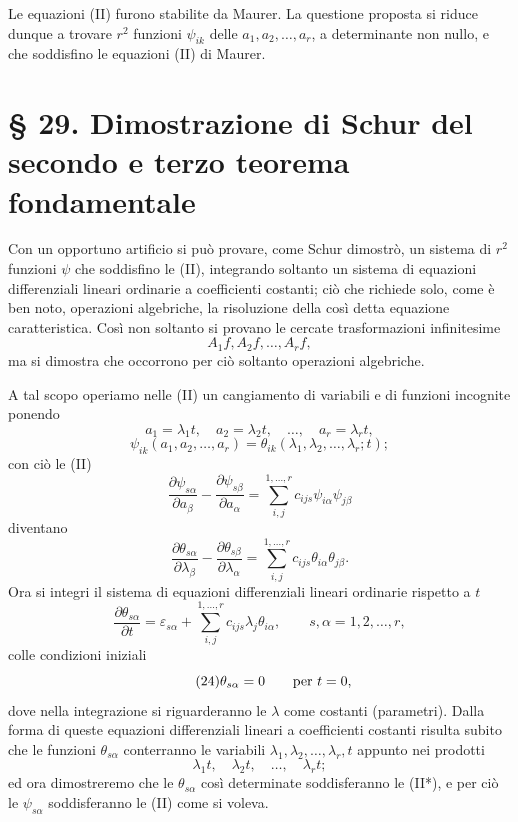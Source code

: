 \documentclass[11pt]{book}
\begin{document}
Le equazioni (II) furono stabilite da Maurer. La questione proposta si riduce dunque a trovare $r^2$ funzioni $\psi_{ik}$ delle $a_1,a_2,\ldots,a_r$, a determinante non nullo, e che soddisfino le equazioni (II) di Maurer.

\section*{\S{} 29. Dimostrazione di Schur del secondo e terzo teorema fondamentale}

Con un opportuno artificio si può provare, come Schur dimostrò, un sistema di $r^2$ funzioni $\psi$ che soddisfino le (II), integrando soltanto un sistema di equazioni differenziali lineari ordinarie a coefficienti costanti; ciò che richiede solo, come è ben noto, operazioni algebriche, la risoluzione della così detta equazione caratteristica. Così non soltanto si provano le cercate trasformazioni infinitesime
\[
 A_1f,A_2f,\ldots,A_rf,
\]
ma si dimostra che occorrono per ciò soltanto operazioni algebriche.

A tal scopo operiamo nelle (II) un cangiamento di variabili e di funzioni incognite ponendo
\[
 a_1=\lambda_1t,
 \quad a_2=\lambda_2t,
 \quad \ldots,
 \quad a_r=\lambda_rt,
\]
\[
 \psi_{ik}(a_1,a_2,\ldots,a_r)=\theta_{ik}(\lambda_1,\lambda_2,\ldots,\lambda_r;t);
\]
con ciò le (II)
\[
 \frac{\partial\psi_{s\alpha}}{\partial a_\beta}
 -\frac{\partial\psi_{s\beta}}{\partial a_\alpha}
 =\sum\limits_{i,j}^{1,\ldots,r}c_{ijs}\psi_{i\alpha}\psi_{j\beta}
\]
diventano
\begin{equation*}\tag{II*}
 \frac{\partial\theta_{s\alpha}}{\partial\lambda_\beta}
 -\frac{\partial\theta_{s\beta}}{\partial\lambda_\alpha}
 =\sum\limits_{i,j}^{1,\ldots,r}c_{ijs}\theta_{i\alpha}\theta_{j\beta}.
\end{equation*}
Ora si integri il sistema di equazioni differenziali lineari ordinarie rispetto a $t$
\begin{equation*}\tag{23}
 \frac{\partial\theta_{s\alpha}}{\partial t}
 =\varepsilon_{s\alpha}+\sum\limits_{i,j}^{1,\ldots,r}c_{ijs}\lambda_j\theta_{i\alpha},
 \qquad s,\alpha=1,2,\ldots,r,
\end{equation*}
colle condizioni iniziali
\begin{equation*}\tag{24}
 \theta_{s\alpha}=0\qquad\hbox{per }t=0,
\end{equation*}
dove nella integrazione si riguarderanno le $\lambda$ come costanti (parametri). Dalla forma di queste equazioni differenziali lineari a coefficienti costanti risulta subito che le funzioni $\theta_{s\alpha}$ conterranno le variabili $\lambda_1,\lambda_2,\ldots,\lambda_r,t$ appunto nei prodotti
\[
 \lambda_1t,\quad \lambda_2t,\quad \ldots,
 \quad \lambda_rt;
\]
ed ora dimostreremo che le $\theta_{s\alpha}$ così determinate soddisferanno le (II*), e per ciò le $\psi_{s\alpha}$ soddisferanno le (II) come si voleva.
\end{document}
